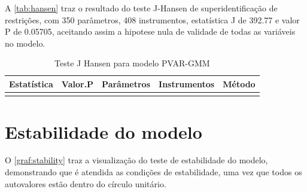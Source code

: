 \documentclass[
  12pt,
  12pt,
  openright,
  oneside,
  a4paper,
  chapter=TITLE,
  section=TITLE,
  subsection=TITLE,
  subsubsection=TITLE,
  english,
  portugues,
  sumario=tradicional]{abntex2}
\begin{document}
A \autoref{tab:hansen} traz o resultado do teste J-Hansen de superidentificação de restrições, com 350 parâmetros, 408 instrumentos, estatística J de 392.77 e valor P de 0.05705, aceitando assim a hipotese nula de validade de todas as variáveis no modelo.

\begin{table}[!hbtp]
\caption{Teste J Hansen para modelo PVAR-GMM}
\vspace{-1mm}

\begin{tabu} to 
\toprule
Estatística & Valor.P & Parâmetros & Instrumentos & Método\\
\midrule
{} &  &  &  & \\
\bottomrule
\end{tabu}
\vspace{1mm}
\label{tab:hansen}
\vspace{-2mm}
\end{table}

\section{Estabilidade do modelo}

O \autoref{graf:stability} traz a visualização do teste de estabilidade do modelo, demonstrando que é atendida as condições de estabilidade, uma vez que todos os autovalores estão dentro do círculo unitário.
\end{document}
